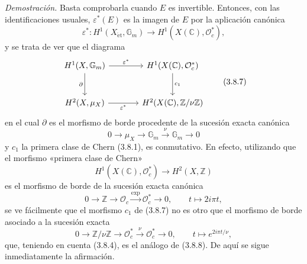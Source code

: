 \emph{Demostración.} Basta comprobarla cuando $E$ es invertible. Entonces, con las identificaciones usuales, $\varepsilon^*(E)$ es la imagen de $E$ por la aplicación canónica
\[
\varepsilon^*:H^1(X_{\mathrm{\acute et}},\mathbb G_m)\to H^1(X(\mathbb C),\mathcal O_c^*),
\tag{3.8.6}
\]
y se trata de ver que el diagrama
\[
\begin{tikzcd}[column sep=large,row sep=large]
H^1(X,\mathbb G_m) \arrow[r,"\varepsilon^*"] \arrow[d,"\partial"'] &
H^1(X(\mathbb C),\mathcal O_c^*) \arrow[d,"c_1"]\\
H^2(X,\mu_X) \arrow[r,"\varepsilon^*"'] &
H^2(X(\mathbb C),\mathbb Z/\nu\mathbb Z)
\end{tikzcd}
\tag{3.8.7}
\]
en el cual $\partial$ es el morfismo de borde procedente de la sucesión exacta canónica
\[
0\to \mu_X\to\mathbb G_m\xrightarrow{\nu}\mathbb G_m\to0
\tag{3.8.8}
\]
y $c_1$ la primera clase de Chern (3.8.1), es conmutativo. En efecto, utilizando que el morfismo «primera clase de Chern»
\[
H^1(X(\mathbb C),\mathcal O_c^*)\to H^2(X,\mathbb Z)
\]
es el morfismo de borde de la sucesión exacta canónica
\[
0\to\mathbb Z\to\mathcal O_c\xrightarrow{\exp}\mathcal O_c^*\to0,
\qquad
t\mapsto 2i\pi t,
\]
se ve fácilmente que el morfismo $c_1$ de (3.8.7) no es otro que el morfismo de borde asociado a la sucesión exacta
\[
0\to\mathbb Z/\nu\mathbb Z\to\mathcal O_c^*\xrightarrow{\nu}\mathcal O_c^*\to0,
\qquad
t\mapsto e^{2i\pi t/\nu},
\]
que, teniendo en cuenta (3.8.4), es el análogo de (3.8.8). De aquí se sigue inmediatamente la afirmación.

